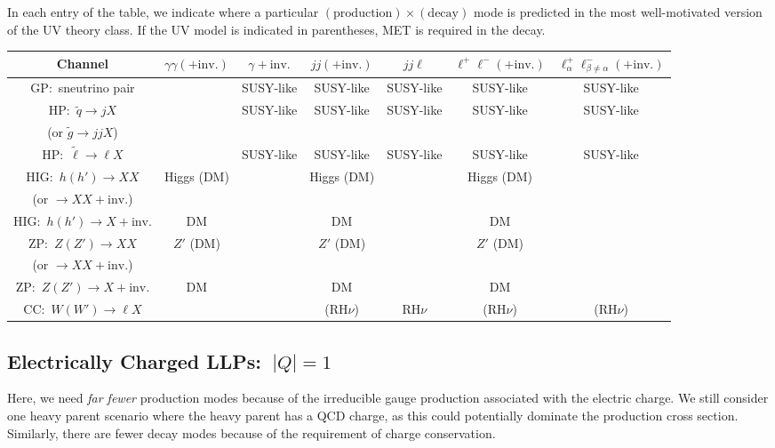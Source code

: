 In each entry of the table, we indicate where a particular $(\mathrm{production})\times(\mathrm{decay})$ mode is predicted in the most well-motivated version of the UV theory class. If the UV model is indicated in parentheses, MET is required in the decay.

\begin{center}
\begin{tabular}{ |c|c|c|c|c|c|c| } 
 \hline
Channel & $\gamma\gamma(+\mathrm{inv.})$ & $\gamma+\mathrm{inv.}$ & $jj(+\mathrm{inv.})$ & $jj\ell$ & $\ell^+\ell^-(+\mathrm{inv.})$ & $\ell_\alpha^+\ell_{\beta\neq\alpha}^-(+\mathrm{inv.})$\\
\hline\hline
GP:~sneutrino pair &  & SUSY-like & SUSY-like & SUSY-like & SUSY-like & SUSY-like\\
 \hline
 HP:~$\tilde{q}\rightarrow jX$ &  & SUSY-like & SUSY-like & SUSY-like & SUSY-like & SUSY-like\\
 (or $\tilde g\rightarrow jjX$) &&&&&&\\
 \hline
HP:~$\tilde{\ell}\rightarrow\ell X$ &  & SUSY-like & SUSY-like & SUSY-like & SUSY-like & SUSY-like\\
 \hline 
 HIG:~$h(h')\rightarrow XX$ & Higgs (DM)  &  & Higgs (DM) &  & Higgs (DM) & \\
  (or $\rightarrow XX+\mathrm{inv.}$) &&&&&&\\
 \hline 
 HIG:~$h(h')\rightarrow X+\mathrm{inv.}$ & DM  &  & DM &  & DM & \\
  \hline
   ZP:~$Z(Z')\rightarrow XX$ & $Z'$ (DM)  &  & $Z'$ (DM) &  & $Z'$ (DM) & \\
  (or $\rightarrow XX+\mathrm{inv.}$) &&&&&&\\
 \hline 
 ZP:~$Z(Z')\rightarrow X+\mathrm{inv.}$ & DM  &  & DM &  & DM & \\
  \hline
   CC:~$W(W')\rightarrow \ell X$ &   &  & (RH$\nu$) & RH$\nu$ & (RH$\nu$) & (RH$\nu$) \\
  \hline
\end{tabular}
\end{center}

\subsection{Electrically Charged LLPs:~$|Q|=1$}

Here, we need \emph{far fewer} production modes because of the irreducible gauge production associated with the electric charge. We still consider one heavy parent scenario where the heavy parent has a QCD charge, as this could potentially dominate the production cross section. Similarly, there are fewer decay modes because of the requirement of charge conservation.

